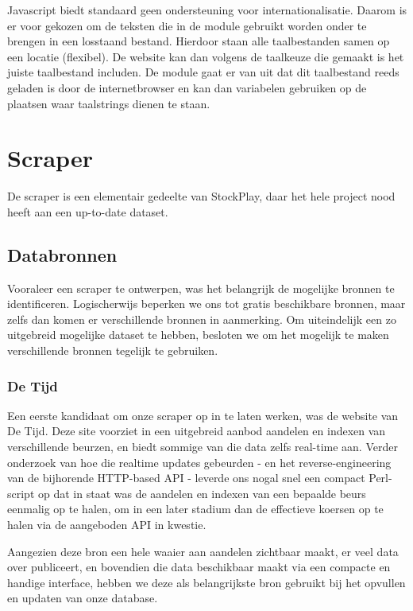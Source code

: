 Javascript biedt standaard geen ondersteuning voor internationalisatie. Daarom is er voor gekozen om de teksten die in de module gebruikt worden onder te brengen in een losstaand bestand. Hierdoor staan alle taalbestanden samen op een locatie (flexibel). De website kan dan volgens de taalkeuze die gemaakt is het juiste taalbestand includen. De module gaat er van uit dat dit taalbestand reeds geladen is door de internetbrowser en kan dan variabelen gebruiken op de plaatsen waar taalstrings dienen te staan.

%
%

\chapter{Scraper}

De scraper is een elementair gedeelte van StockPlay, daar het hele project nood heeft aan een up-to-date dataset.

\section{Databronnen}

Vooraleer een scraper te ontwerpen, was het belangrijk de mogelijke bronnen te identificeren. Logischerwijs beperken we ons tot gratis beschikbare bronnen, maar zelfs dan komen er verschillende bronnen in aanmerking. Om uiteindelijk een zo uitgebreid mogelijke dataset te hebben, besloten we om het mogelijk te maken verschillende bronnen tegelijk te gebruiken.

\subsection{De Tijd}

Een eerste kandidaat om onze scraper op in te laten werken, was de website van De Tijd. Deze site voorziet in een uitgebreid aanbod aandelen en indexen van verschillende beurzen, en biedt sommige van die data zelfs real-time aan. Verder onderzoek van hoe die realtime updates gebeurden - en het reverse-engineering van de bijhorende HTTP-based API - leverde ons nogal snel een compact Perl-script op dat in staat was de aandelen en indexen van een bepaalde beurs eenmalig op te halen, om in een later stadium dan de effectieve koersen op te halen via de aangeboden API in kwestie.

Aangezien deze bron een hele waaier aan aandelen zichtbaar maakt, er veel data over publiceert, en bovendien die data beschikbaar maakt via een compacte en handige interface, hebben we deze als belangrijkste bron gebruikt bij het opvullen en updaten van onze database.

